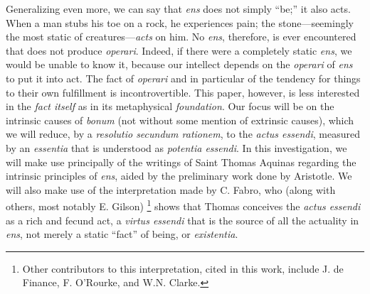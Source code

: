Generalizing even more, we can say that \emph{ens} does not simply “be;” it also acts. When a man stubs his toe on a rock, he experiences pain; the stone—seemingly the most static of creatures—\emph{acts} on him. No \emph{ens}, therefore, is ever encountered that does not produce \emph{operari}. Indeed, if there were a completely static \emph{ens}, we would be unable to know it, because our intellect depends on the \emph{operari} of \emph{ens} to put it into act. The fact of \emph{operari} and in particular of the tendency for things to their own fulfillment is incontrovertible. This paper, however, is less interested in the \emph{fact itself} as in its metaphysical \emph{foundation}. Our focus will be on the intrinsic causes of \emph{bonum} (not without some mention of extrinsic causes), which we will reduce, by a \emph{resolutio secundum rationem}, to the \emph{actus essendi}, measured by an \emph{essentia} that is understood as \emph{potentia essendi}. In this investigation, we will make use principally of the writings of Saint Thomas Aquinas regarding the intrinsic principles of \emph{ens}, aided by the preliminary work done by Aristotle. We will also make use of the interpretation made by C. Fabro, who (along with others, most notably E. Gilson)%
%
\footnote{Other contributors to this interpretation, cited in this work, include J. de Finance, F. O’Rourke, and W.N. Clarke.}
%
shows that Thomas conceives the \emph{actus essendi} as a rich and fecund act, a \emph{virtus essendi} that is the source of all the actuality in \emph{ens}, not merely a static “fact” of being, or \emph{existentia}.

